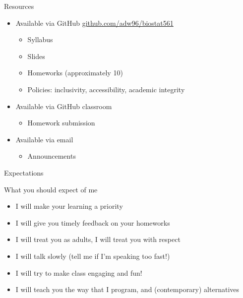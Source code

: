 \documentclass[ignorenonframetext,]{beamer}
\providecommand{\tightlist}{%
  \setlength{\itemsep}{0pt}\setlength{\parskip}{0pt}}
\begin{document}
\begin{frame}{Resources}
\protect\hypertarget{resources}{}

\begin{itemize}
\tightlist
\item
  Available via GitHub \url{github.com/adw96/biostat561}

  \begin{itemize}
  \tightlist
  \item
    Syllabus
  \item
    Slides
  \item
    Homeworks (approximately 10)
  \item
    Policies: inclusivity, accessibility, academic integrity
  \end{itemize}
\item
  Available via GitHub classroom

  \begin{itemize}
  \tightlist
  \item
    Homework submission
  \end{itemize}
\item
  Available via email

  \begin{itemize}
  \tightlist
  \item
    Announcements
  \end{itemize}
\end{itemize}

\end{frame}

\begin{frame}{Expectations}
\protect\hypertarget{expectations}{}

What you should expect of me

\begin{itemize}
\tightlist
\item
  I will make your learning a priority
\item
  I will give you timely feedback on your homeworks
\item
  I will treat you as adults, I will treat you with respect
\item
  I will talk slowly (tell me if I'm speaking too fast!)
\item
  I will try to make class engaging and fun!
\item
  I will teach you the way that I program, and (contemporary)
  alternatives
\end{itemize}

\end{frame}
\end{document}
